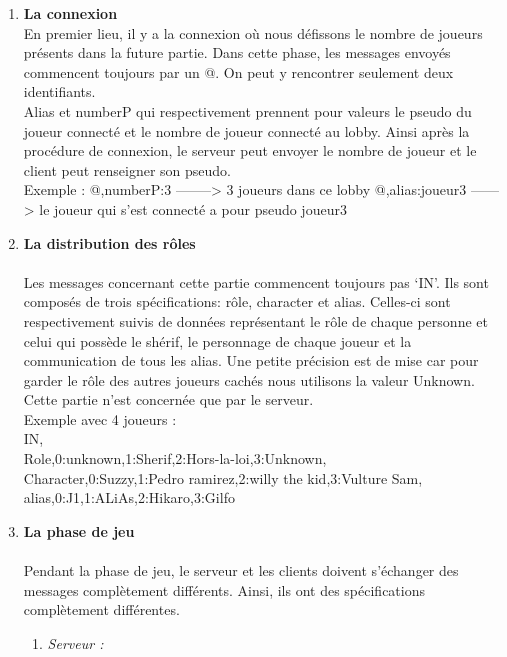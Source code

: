 \documentclass[a4paper,11pt]{article}
\begin{document}
\begin{enumerate}
	\item \textbf{La connexion} \\
	En premier lieu, il y a la connexion où nous défissons le nombre de joueurs présents dans la future partie. Dans cette phase, les messages envoyés commencent toujours par un @. On peut y rencontrer seulement deux identifiants. \\
Alias et numberP qui respectivement prennent pour valeurs le pseudo du joueur connecté et le nombre de joueur connecté au lobby. Ainsi après la procédure de connexion, le serveur peut envoyer le nombre de joueur et le client peut renseigner son pseudo. \\

Exemple :
@,numberP:3  --------> 3 joueurs dans ce lobby
@,alias:joueur3  ------> le joueur qui s’est connecté a pour pseudo joueur3 \\


	
	\item \textbf{La distribution des rôles} \\\\
	Les messages concernant cette partie commencent toujours pas ‘IN’. Ils sont composés de trois spécifications: rôle, character et alias. Celles-ci sont respectivement suivis de données représentant le rôle de chaque personne et celui qui possède le shérif, le personnage de chaque joueur et la communication de tous les alias. Une petite précision est de mise car pour garder le rôle des autres joueurs cachés nous utilisons la valeur Unknown. Cette partie n’est concernée que par le serveur. \\

Exemple avec 4 joueurs : \\
IN, \\
Role,0:unknown,1:Sherif,2:Hors-la-loi,3:Unknown, \\
Character,0:Suzzy,1:Pedro ramirez,2:willy the kid,3:Vulture Sam, \\
alias,0:J1,1:ALiAs,2:Hikaro,3:Gilfo \\

\newpage

	\item \textbf{La phase de jeu} \\\\
	Pendant la phase de jeu, le serveur et les clients doivent s’échanger des messages complètement différents. Ainsi, ils ont des spécifications complètement différentes. \\
		\begin{enumerate}[label=(\roman*)]
		\item \textit{Serveur :}\\
		

\end{enumerate}
\end{enumerate}
\end{document}
